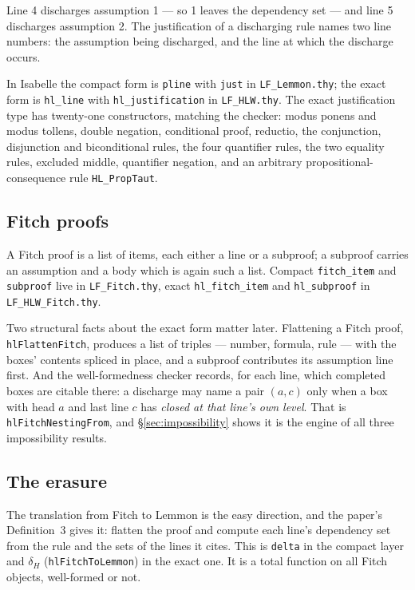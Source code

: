 \documentclass[11pt]{article}
\theoremstyle{plain}
\newcommand{\ubrk}{\_\discretionary{}{}{}}
\newcommand{\isa}[1]{\textup{\texttt{\small #1}}}
\newcommand{\thy}[1]{\textup{\texttt{\small #1}}}
\begin{document}
\noindent
Line 4 discharges assumption 1 --- so 1 leaves the dependency set --- and line 5
discharges assumption 2. The justification of a discharging rule names two line
numbers: the assumption being discharged, and the line at which the discharge
occurs.

In Isabelle the compact form is \isa{pline} with \isa{just} in
\thy{LF\ubrk{}Lemmon.thy}; the exact form is \isa{hl\ubrk{}line} with
\isa{hl\ubrk{}justification} in \thy{LF\ubrk{}HLW.thy}. The exact justification type has
twenty-one constructors, matching the checker: modus ponens and modus tollens,
double negation, conditional proof, reductio, the conjunction, disjunction and
biconditional rules, the four quantifier rules, the two equality rules,
excluded middle, quantifier negation, and an arbitrary propositional-consequence
rule \isa{HL\ubrk{}PropTaut}.

\subsection{Fitch proofs}

A Fitch proof is a list of items, each either a line or a subproof; a subproof
carries an assumption and a body which is again such a list. Compact
\isa{fitch\ubrk{}item} and \isa{subproof} live in \thy{LF\ubrk{}Fitch.thy}, exact
\isa{hl\ubrk{}fitch\ubrk{}item} and \isa{hl\ubrk{}subproof} in \thy{LF\ubrk{}HLW\ubrk{}Fitch.thy}.

Two structural facts about the exact form matter later. Flattening a Fitch
proof, \isa{hlFlattenFitch}, produces a list of triples --- number, formula,
rule --- with the boxes' contents spliced in place, and a subproof contributes
its assumption line first. And the well-formedness checker records, for each
line, which completed boxes are citable there: a discharge may name a pair
$(a,c)$ only when a box with head $a$ and last line $c$ has \emph{closed at
that line's own level}. That is \isa{hlFitchNestingFrom}, and
\S\ref{sec:impossibility} shows it is the engine of all three impossibility
results.

\subsection{The erasure}

The translation from Fitch to Lemmon is the easy direction, and the paper's
Definition~3 gives it: flatten the proof and compute each line's dependency set
from the rule and the sets of the lines it cites. This is \isa{delta} in the
compact layer and $\delta_H$ (\isa{hlFitchToLemmon}) in the exact one. It is a
total function on all Fitch objects, well-formed or not.
\end{document}
